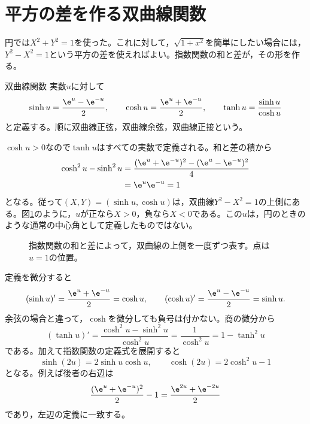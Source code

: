 \section{平方の差を作る双曲線関数}\label{節:双曲線関数}

円では$X^2+Y^2=1$を使った。これに対して，$\sqrt{1+x^2}$を簡単にしたい場合には，$Y^2-X^2=1$という平方の差を使えればよい。指数関数の和と差が，その形を作る。

\begin{definition}{双曲線関数}
実数$u$に対して
\[
\sinh u=\frac{\e^u-\e^{-u}}2,\qquad
\cosh u=\frac{\e^u+\e^{-u}}2,\qquad
\tanh u=\frac{\sinh u}{\cosh u}
\]
と定義する。順に双曲線正弦，双曲線余弦，双曲線正接という。
\end{definition}

$\cosh u>0$なので$\tanh u$はすべての実数で定義される。和と差の積から
\[
\begin{aligned}
\cosh^2u-\sinh^2u
&=\frac{(\e^u+\e^{-u})^2-(\e^u-\e^{-u})^2}{4}\\
&=\e^u\e^{-u}=1
\end{aligned}
\]
となる。従って$(X,Y)=(\sinh u,\cosh u)$は，双曲線$Y^2-X^2=1$の上側にある。図\ref{図:双曲線の媒介表示}のように，$u$が正なら$X>0$，負なら$X<0$である。この$u$は，円のときのような通常の中心角として定義したものではない。

\begin{figure}[htbp]
\centering
{}
\caption{指数関数の和と差によって，双曲線の上側を一度ずつ表す。点は$u=1$の位置。}
\label{図:双曲線の媒介表示}
\end{figure}

定義を微分すると
\[
(\sinh u)'=\frac{\e^u+\e^{-u}}2=\cosh u,
\qquad
(\cosh u)'=\frac{\e^u-\e^{-u}}2=\sinh u.
\]
余弦の場合と違って，$\cosh$を微分しても負号は付かない。商の微分から
\begin{equation}\label{式:双曲線正接の微分}
(\tanh u)'=\frac{\cosh^2u-\sinh^2u}{\cosh^2u}
=\frac1{\cosh^2u}=1-\tanh^2u
\end{equation}
である。加えて指数関数の定義式を展開すると
\begin{equation}\label{式:双曲線の二倍公式}
\sinh(2u)=2\sinh u\cosh u,\qquad
\cosh(2u)=2\cosh^2u-1
\end{equation}
となる。例えば後者の右辺は
\[
\frac{(\e^u+\e^{-u})^2}{2}-1
=\frac{\e^{2u}+\e^{-2u}}2
\]
であり，左辺の定義に一致する。

%
